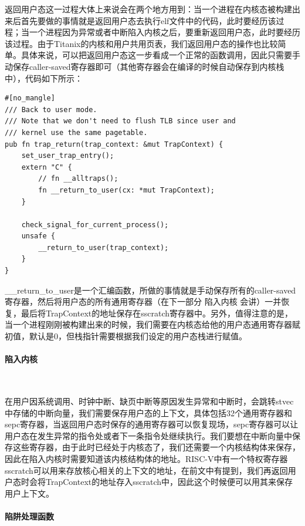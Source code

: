 返回用户态这一过程大体上来说会在两个地方用到：当一个进程在内核态被构建出来后首先要做的事情就是返回用户态去执行elf文件中的代码，此时要经历该过程；当一个进程因为异常或者中断陷入内核之后，要重新返回用户态，此时要经历该过程。由于Titanix的内核和用户共用页表，我们返回用户态的操作也比较简单。具体来说，可以把返回用户态这一步看成一个正常的函数调用，因此只需要手动保存caller-saved寄存器即可（其他寄存器会在编译的时候自动保存到内核栈中），代码如下所示：
\begin{tcolorbox}[
title=\textbf{os/src/trap/mod.rs},
listing only,
breakable
]
    \begin{verbatim}
#[no_mangle]
/// Back to user mode.
/// Note that we don't need to flush TLB since user and
/// kernel use the same pagetable.
pub fn trap_return(trap_context: &mut TrapContext) {
    set_user_trap_entry();
    extern "C" {
        // fn __alltraps();
        fn __return_to_user(cx: *mut TrapContext);
    }

    check_signal_for_current_process();
    unsafe {
        __return_to_user(trap_context);
    }
}
    \end{verbatim}
\end{tcolorbox}

\_\_return\_to\_user是一个汇编函数，所做的事情就是手动保存所有的caller-saved寄存器，然后将用户态的所有通用寄存器（在下一部分 陷入内核 会讲）一并恢复，最后将TrapContext的地址保存在sscratch寄存器中。另外，值得注意的是，当一个进程刚刚被构建出来的时候，我们需要在内核态给他的用户态通用寄存器赋初值，默认是0，但栈指针需要根据我们设定的用户态栈进行赋值。

\paragraph{陷入内核}~{}

在用户因系统调用、时钟中断、缺页中断等原因发生异常和中断时，会跳转stvec中存储的中断向量，我们需要保存用户态的上下文，具体包括32个通用寄存器和sepc寄存器，当返回用户态时保存的通用寄存器可以恢复现场，sepc寄存器可以让用户态在发生异常的指令处或者下一条指令处继续执行。我们要想在中断向量中保存这些寄存器，由于此时已经处于内核态了，我们还需要一个内核结构体来保存，因此在陷入内核时需要知道该内核结构体的地址。RISC-V中有一个特权寄存器sscratch可以用来存放核心相关的上下文的地址，在前文中有提到，我们再返回用户态时会将TrapContext的地址存入sscratch中，因此这个时候便可以用其来保存用户上下文。

\paragraph{陷阱处理函数}~{}

